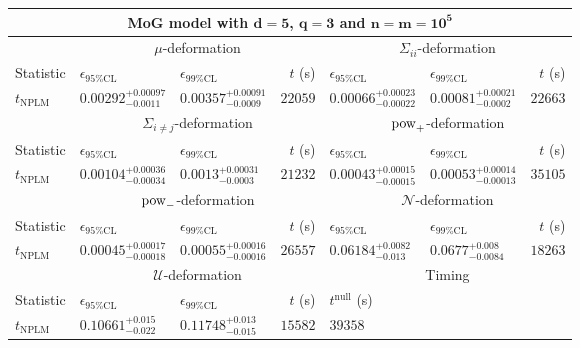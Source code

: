 \begin{tabular}{l|llr|llr}
	\toprule
	\multicolumn{7}{c}{{\bf MoG model with $\mathbf{d=5}$, $\mathbf{q=3}$ and $\mathbf{n=m=10^{5}}$}} \\
	\toprule
	\multicolumn{1}{c}{} & \multicolumn{3}{c}{$\mu$-deformation} & \multicolumn{3}{c}{$\Sigma_{ii}$-deformation} \\
	Statistic & $\epsilon_{95\%\mathrm{CL}}$ & $\epsilon_{99\%\mathrm{CL}}$ & $t$ (s) & $\epsilon_{95\%\mathrm{CL}}$ & $\epsilon_{99\%\mathrm{CL}}$ & $t$ (s) \\
	\midrule
	$t_{\mathrm{NPLM}}$ & $0.00292_{-0.0011}^{+0.00097}$ & $0.00357_{-0.0009}^{+0.00091}$ & $22059$ & $0.00066_{-0.00022}^{+0.00023}$ & $0.00081_{-0.0002}^{+0.00021}$ & $22663$ \\
	\toprule
	\multicolumn{1}{c}{} & \multicolumn{3}{c}{$\Sigma_{i\neq j}$-deformation} & \multicolumn{3}{c}{$\rm{pow}_{+}$-deformation} \\
	Statistic & $\epsilon_{95\%\mathrm{CL}}$ & $\epsilon_{99\%\mathrm{CL}}$ & $t$ (s) & $\epsilon_{95\%\mathrm{CL}}$ & $\epsilon_{99\%\mathrm{CL}}$ & $t$ (s) \\
	\midrule
	$t_{\mathrm{NPLM}}$ & $0.00104_{-0.00034}^{+0.00036}$ & $0.0013_{-0.0003}^{+0.00031}$ & $21232$ & $0.00043_{-0.00015}^{+0.00015}$ & $0.00053_{-0.00013}^{+0.00014}$ & $35105$ \\
	\toprule
	\multicolumn{1}{c}{} & \multicolumn{3}{c}{$\rm{pow}_{-}$-deformation} & \multicolumn{3}{c}{$\mathcal{N}$-deformation} \\
	Statistic & $\epsilon_{95\%\mathrm{CL}}$ & $\epsilon_{99\%\mathrm{CL}}$ & $t$ (s) & $\epsilon_{95\%\mathrm{CL}}$ & $\epsilon_{99\%\mathrm{CL}}$ & $t$ (s) \\
	\midrule
	$t_{\mathrm{NPLM}}$ & $0.00045_{-0.00018}^{+0.00017}$ & $0.00055_{-0.00016}^{+0.00016}$ & $26557$ & $0.06184_{-0.013}^{+0.0082}$ & $0.0677_{-0.0084}^{+0.008}$ & $18263$ \\
	\toprule
	\multicolumn{1}{c}{} & \multicolumn{3}{c}{$\mathcal{U}$-deformation} & \multicolumn{3}{c}{Timing} \\
	Statistic & $\epsilon_{95\%\mathrm{CL}}$ & $\epsilon_{99\%\mathrm{CL}}$ & $t$ (s) & $t^{\mathrm{null}}$ (s) \\
	\midrule
	$t_{\mathrm{NPLM}}$ & $0.10661_{-0.022}^{+0.015}$ & $0.11748_{-0.015}^{+0.013}$ & $15582$ & $39358$ \\
	\bottomrule
\end{tabular}